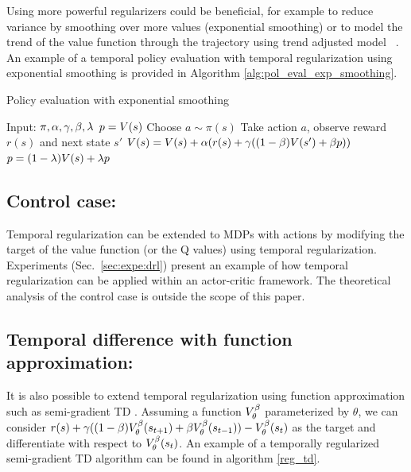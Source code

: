 Using more powerful regularizers could be beneficial, for example to reduce variance by smoothing over more values (exponential smoothing) or to model the trend of the value function through the trajectory using trend adjusted model ~\cite{gardner1985exponential}. An example of a temporal policy evaluation with temporal regularization using exponential smoothing is provided in Algorithm \ref{alg:pol_eval_exp_smoothing}.
\begin{algorithm}[H]
\caption{Policy evaluation with exponential smoothing}
\begin{algorithmic}[1]
    \STATE Input: $\pi,\alpha,\gamma,\beta,\lambda$
    \STATE $p = V(s)$
        \STATE Choose $a \sim \pi(s)$
        \STATE Take action $a$, observe reward $r(s)$ and next state $s'$
        \STATE $V(s) = V(s) +  \alpha (r(s) + \gamma ( (1-\beta) V(s') + \beta p)) $
        \STATE $p = (1-\lambda)V(s) + \lambda p$
    \ENDFOR
\end{algorithmic}
\label{alg:pol_eval_exp_smoothing}
\end{algorithm}


\subsection{Control case:} 
Temporal regularization can be extended to MDPs with actions by  modifying the target of the value function (or the Q values) using temporal regularization. Experiments (Sec.~\ref{sec:expe:drl}) present an example of how temporal regularization can be applied within an actor-critic framework. The theoretical analysis of the control case is outside the scope of this paper.

\subsection{Temporal difference with function approximation:}
It is also possible to extend temporal regularization using function approximation such as  semi-gradient TD \cite{sutton2017reinforcement}. 
Assuming a function $V_{\theta}^{\beta}$ parameterized by $\theta$, we can consider $r(s) + \gamma ((1-\beta)V_{\theta}^{\beta}(s_{t+1}) + \beta V_{\theta}^{\beta}(s_{t-1})) - V_{\theta}^{\beta}(s_t)$  as the target and differentiate with respect to $V_{\theta}^{\beta}(s_{t})$. An example of a temporally regularized semi-gradient TD algorithm can be found in algorithm \ref{reg_td}.

